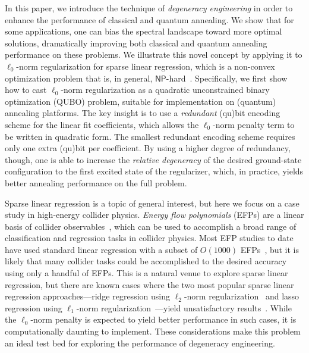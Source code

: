 \documentclass[aps,prd,twocolumn, superscriptaddress,preprintnumbers, nofootinbib,longbibliography,floatfix]{revtex4-2}
\begin{document}
In this paper, we introduce the technique of \emph{degeneracy engineering} in order to enhance the performance of classical and quantum annealing.
%
We show that for some applications, one can bias the spectral landscape toward more optimal solutions, dramatically improving both classical and quantum annealing performance on these problems.
%
We illustrate this novel concept by applying it to $\ell_0$-norm regularization for sparse linear regression, which is a non-convex optimization problem that is, in general, $\textsf{NP}$-hard~\cite{doi:10.1137/S0097539792240406}.
%
Specifically, we first show how to cast $\ell_0$-norm regularization as a quadratic unconstrained binary optimization (QUBO) problem, suitable for implementation on (quantum) annealing platforms.
%
The key insight is to use a \emph{redundant} (qu)bit encoding scheme for the linear fit coefficients, which allows the $\ell_0$-norm penalty term to be written in quadratic form.
%
The smallest redundant encoding scheme requires only one extra (qu)bit per coefficient.
%
By using a higher degree of redundancy, though, one is able to increase the \emph{relative degeneracy} of the desired ground-state configuration to the first excited state of the regularizer, which, in practice, yields better annealing performance on the full problem.


Sparse linear regression is a topic of general interest, but here we focus on a case study in high-energy collider physics.
%
\emph{Energy flow polynomials} (EFPs) are a linear basis of collider observables~\cite{Komiske:2017aww}, which can be used to accomplish a broad range of classification and regression tasks in collider physics.
%
Most EFP studies to date have used standard linear regression with a subset of $O(1000)$ EFPs~\cite{Komiske:2018vkc,Kasieczka:2019dbj}, but it is likely that many collider tasks could be accomplished to the desired accuracy using only a handful of EFPs.
%
This is a natural venue to explore sparse linear 
regression, but there are known cases where the two most popular sparse linear regression approaches---ridge regression using $\ell_2$-norm regularization~\cite{hoerl1970ridgeregression} and lasso regression using $\ell_1$-norm regularization~\cite{Tibshirani1996}---yield unsatisfactory results~\cite{Komiske:2017aww,Komiske:2019asc}.
%
While the $\ell_0$-norm penalty is expected to yield better performance in such cases, it is computationally daunting to implement.
%
These considerations make this problem an ideal test bed for exploring the performance of degeneracy engineering.
\end{document}
